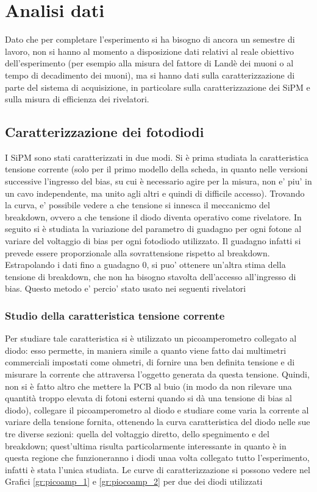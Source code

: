 \section{Analisi dati}
Dato che per completare l'esperimento si ha bisogno di ancora un semestre di lavoro, non si hanno al momento a disposizione dati relativi al reale obiettivo dell'esperimento
(per esempio alla misura del fattore di Landè dei muoni o al tempo di decadimento dei muoni), ma si hanno dati sulla caratterizzazione di parte del sistema di acquisizione,
in particolare sulla caratterizzazione dei SiPM e sulla misura di efficienza dei rivelatori.

\subsection{Caratterizzazione dei fotodiodi}
I SiPM sono stati caratterizzati in due modi. Si è prima studiata la caratteristica tensione corrente (solo per il primo modello della scheda, in quanto nelle versioni successive l'ingresso del bias, su cui \`e necessario agire per la misura, non e' piu' in un cavo independente, ma unito agli altri e quindi di difficile accesso). Trovando la curva, e' possibile vedere a che tensione si innesca il meccanicmo del breakdown, ovvero a che tensione il diodo diventa operativo come rivelatore.
In seguito si è studiata la variazione del parametro di guadagno per ogni fotone al variare del voltaggio di bias per ogni fotodiodo utilizzato. Il guadagno infatti si prevede essere proporzionale alla sovrattensione rispetto al breakdown. Estrapolando i dati fino a guadagno 0, si puo' ottenere un'altra stima della tensione di breakdown, che non ha bisogno stavolta dell'accesso all'ingresso di bias. Questo metodo e' percio' stato usato nei seguenti rivelatori

\subsubsection{Studio della caratteristica tensione corrente}
Per studiare tale caratteristica si è utilizzato un picoamperometro collegato al diodo: esso permette, in maniera simile a quanto viene fatto dai multimetri commerciali
impostati come ohmetri, di fornire una ben definita tensione e di misurare la corrente che attraversa l'oggetto generata da questa tensione. Quindi,
non si è fatto altro che mettere la PCB al buio (in modo da non rilevare una quantità troppo elevata di fotoni esterni quando si dà una tensione di bias al diodo),
collegare il picoamperometro al diodo e studiare come varia la corrente al variare della tensione fornita, ottenendo la curva caratteristica del diodo nelle sue tre diverse
sezioni: quella del voltaggio diretto, dello spegnimento e del breakdown; quest'ultima risulta particolarmente interessante in quanto è in questa regione che funzioneranno
i diodi unaa volta collegato tutto l'esperimento, infatti è stata l'unica studiata. Le curve di caratterizzazione si possono vedere nel Grafici \ref{gr:picoamp_1} e \ref{gr:piocoamp_2} per due dei diodi utilizzati

